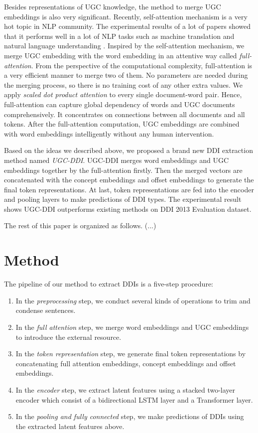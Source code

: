 \documentclass[conference]{IEEEtran}
\begin{document}
Besides representations of UGC knowledge, the method to merge UGC embeddings is also very significant.
Recently, self-attention mechanism is a very hot topic in NLP community.
The experimental results of a lot of papers showed that it performs well in a lot of NLP tasks such as machine translation \cite{vaswani_attention_2017} 
and natural language understanding \cite{shen_disan:_2017}.
Inspired by the self-attention mechanism, we merge UGC embedding with the word embedding in an attentive way
called \emph{full-attention}.
From the perspective of the computational complexity, full-attention is a very efficient manner to merge two of them.
No parameters are needed during the merging process, so there is no training cost of any other extra values.
We apply \emph{scaled dot product attention} to every single document-word pair. 
Hence, full-attention can capture global dependency of words and UGC documents comprehensively.
It concentrates on connections between all documents and all tokens.
After the full-attention computation, UGC embeddings are combined with word embeddings intelligently without any human intervention.

Based on the ideas we described above, we proposed a brand new DDI extraction method named \emph{UGC-DDI}.
UGC-DDI merges word embeddings and UGC embeddings together by the full-attention firstly.
Then the merged vectors are concatenated with the concept embeddings and offset embeddings to generate the final token representations.
At last, token representations are fed into the encoder and pooling layers to make predictions of DDI types.
The experimental result shows UGC-DDI outperforms existing methods on DDI 2013 Evaluation dataset.

The rest of this paper is organized as follows. (...)

\section{Method}

The pipeline of our method to extract DDIs is a five-step procedure:

\begin{enumerate}
	\item In the \emph{preprocessing} step, we conduct several kinds of operations to trim and condense sentences.
	\item In the \emph{full attention} step, we merge word embeddings and UGC embeddings to introduce the external resource.
	\item In the \emph{token representation} step, we generate final token representations by concatenating
	full attention embeddings, concept embeddings and offset embeddings.
	\item In the \emph{encoder} step, we extract latent features using a stacked two-layer encoder
	which consist of a bidirectional LSTM layer and a Transformer layer.
	\item In the \emph{pooling and fully connected} step, we make predictions of DDIs using the extracted latent features above.
\end{enumerate}
\end{document}
